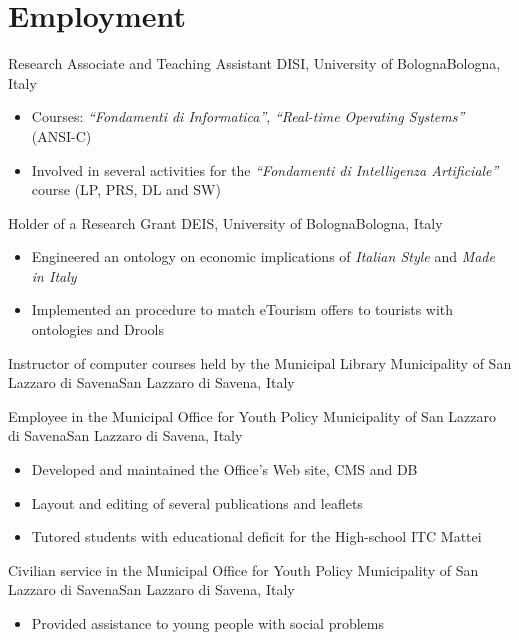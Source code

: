 \section{Employment}

%
{Research Associate and Teaching Assistant}%
{DISI, University of Bologna}{Bologna, Italy}{}{\begin{itemize}
\item Courses: \emph{``Fondamenti di Informatica''}, \emph{``Real\--time Operating Systems''} (ANSI\--C)
\item Involved in several activities for the \emph{``Fondamenti di Intelligenza Artificiale''} course (LP, PRS, DL and SW)
\end{itemize}}

%
{Holder of a Research Grant}%
{DEIS, University of Bologna}{Bologna, Italy}{}{\begin{itemize}
\item Engineered an ontology on economic implications of \emph{Italian Style} and \emph{Made in Italy}
\item Implemented an procedure to match eTourism offers to tourists with ontologies and Drools
\end{itemize}}

%
{Instructor of computer courses held by the Municipal Library}%
{Municipality of San Lazzaro di Savena}{San Lazzaro di Savena, Italy}{}{}

%
{Employee in the Municipal Office for Youth Policy}%
{Municipality of San Lazzaro di Savena}{San Lazzaro di Savena, Italy}{}{\begin{itemize}
\item Developed and maintained the Office's Web site, CMS and DB
\item Layout and editing of several publications and leaflets
\item Tutored students with educational deficit for the High\--school ITC Mattei
\end{itemize}}

%
{Civilian service in the Municipal Office for Youth Policy}%
{Municipality of San Lazzaro di Savena}{San Lazzaro di Savena, Italy}{}{\begin{itemize}
\item Provided assistance to young people with social problems
\end{itemize}}

